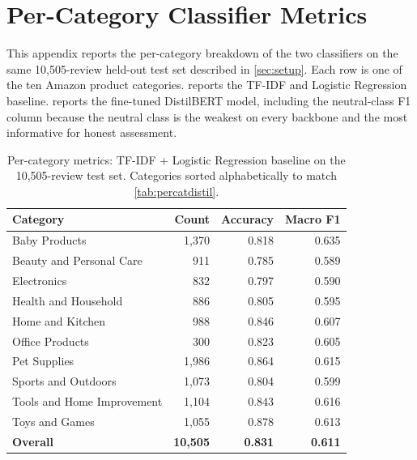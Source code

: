 \documentclass[12pt,a4paper]{report}
\begin{document}
\chapter{Per-Category Classifier Metrics}
\label{app:percategory}

This appendix reports the per-category breakdown of the two classifiers on the same 10,505-review held-out test set described in \cref{sec:setup}. Each row is one of the ten Amazon product categories.  reports the TF-IDF and Logistic Regression baseline.  reports the fine-tuned DistilBERT model, including the neutral-class F1 column because the neutral class is the weakest on every backbone and the most informative for honest assessment.

\begin{table}[ht!]
  \centering
  \caption{Per-category metrics: TF-IDF + Logistic Regression baseline on the 10,505-review test set. Categories sorted alphabetically to match \cref{tab:percatdistil}.}
  \label{tab:percatbaseline}
  \small
  \renewcommand{\arraystretch}{1.05}
  \begin{tabular}{@{}>{\raggedright\arraybackslash}p{2.4in}rrr@{}}
    \toprule
    Category & Count & Accuracy & Macro F1 \\
    \midrule
    Baby Products & 1{,}370 & 0.818 & 0.635 \\
    Beauty and Personal Care & 911 & 0.785 & 0.589 \\
    Electronics & 832 & 0.797 & 0.590 \\
    Health and Household & 886 & 0.805 & 0.595 \\
    Home and Kitchen & 988 & 0.846 & 0.607 \\
    Office Products & 300 & 0.823 & 0.605 \\
    Pet Supplies & 1{,}986 & 0.864 & 0.615 \\
    Sports and Outdoors & 1{,}073 & 0.804 & 0.599 \\
    Tools and Home Improvement & 1{,}104 & 0.843 & 0.616 \\
    Toys and Games & 1{,}055 & 0.878 & 0.613 \\
    \midrule
    \textbf{Overall} & \textbf{10{,}505} & \textbf{0.831} & \textbf{0.611} \\
    \bottomrule
  \end{tabular}
\end{table}
\end{document}
